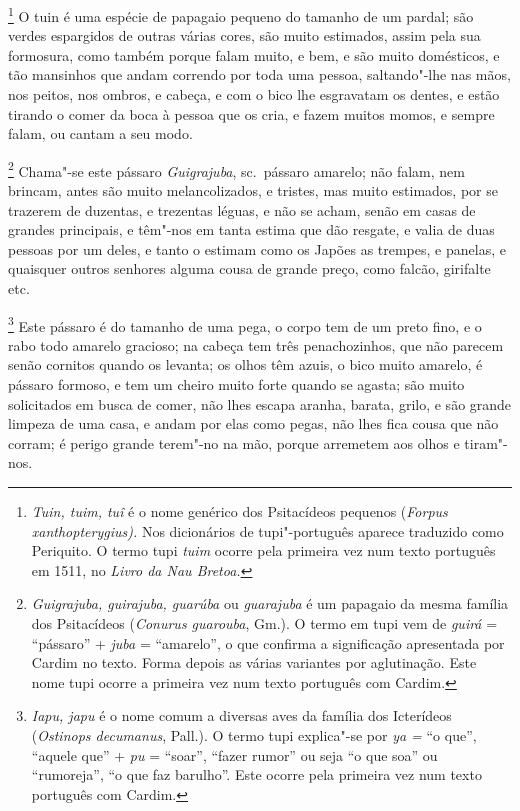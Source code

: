 \footnote{ \textit{Tuin, tuim, tuî} é o nome genérico
dos Psitacídeos pequenos (\textit{Forpus xanthopterygius).} Nos
dicionários de tupi"-português aparece traduzido como Periquito. O termo
tupi \textit{tuim} ocorre pela primeira vez num texto português em
1511, no \textit{Livro da Nau Bretoa.}} O tuin é uma espécie
de papagaio pequeno do tamanho de um pardal; são verdes espargidos de
outras várias cores, são muito estimados, assim pela sua formosura,
como também porque falam muito, e bem, e são muito domésticos, e tão
mansinhos que andam correndo por toda uma pessoa, saltando"-lhe nas
mãos, nos peitos, nos ombros, e cabeça, e com o bico lhe esgravatam os
dentes, e estão tirando o comer da boca à pessoa que os cria, e fazem
muitos momos, e sempre falam, ou cantam a seu modo.

\footnote{ \textit{Guigrajuba, guirajuba,
guarúba} ou \textit{guarajuba} é um papagaio da mesma
família dos Psitacídeos (\textit{Conurus guarouba}, Gm.). O termo em
tupi vem de \textit{guirá} = ``pássaro'' + \textit{juba} = ``amarelo'', o
que confirma a significação apresentada por Cardim no texto. Forma
depois as várias variantes por aglutinação. Este nome tupi ocorre a
primeira vez num texto português com Cardim.} Chama"-se este
pássaro \textit{Guigrajuba}, sc.~pássaro amarelo; não falam, nem
brincam, antes são muito melancolizados, e tristes, mas muito
estimados, por se trazerem de duzentas, e trezentas léguas, e não se
acham, senão em casas de grandes principais, e têm"-nos em tanta estima
que dão resgate, e valia de duas pessoas por um deles, e tanto o
estimam como os Japões as trempes, e panelas, e quaisquer outros
senhores alguma cousa de grande preço, como falcão, girifalte etc.

\footnote{ \textit{Iapu, japu} é o nome comum a
diversas aves da família dos Icterídeos (\textit{Ostinops decumanus}, 
Pall.). O termo tupi explica"-se por \textit{ya =} ``o que'', ``aquele
que'' + \textit{pu} = ``soar'', ``fazer rumor'' ou seja ``o que soa'' ou
``rumoreja'', ``o que faz barulho''. Este ocorre pela primeira vez num
texto português com Cardim.} Este pássaro é do tamanho de uma
pega, o corpo tem de um preto fino, e o rabo todo amarelo gracioso; na
cabeça tem três penachozinhos, que não parecem senão cornitos quando os
levanta; os olhos têm azuis, o bico muito amarelo, é pássaro formoso, e
tem um cheiro muito forte quando se agasta; são muito solicitados em
busca de comer, não lhes escapa aranha, barata, grilo, e são grande
limpeza de uma casa, e andam por elas como pegas, não lhes fica cousa
que não corram; é perigo grande terem"-no na mão, porque arremetem aos
olhos e tiram"-nos.

